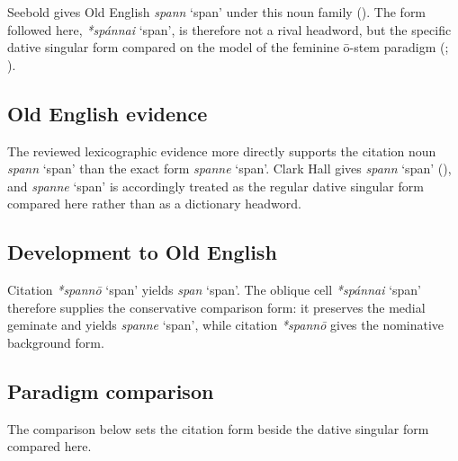 \documentclass[
  british,
  a4paper,
  openany]{book}
\providecommand{\Recon}[1]{\emph{*#1}}
{\catcode`→=\active \global\def→{\ensuremath{\rightarrow}}}
\providecommand{\Recon}[1]{\emph{*#1}}
{\catcode`→=\active \global\def→{\ensuremath{\rightarrow}}}
\begin{document}
Seebold gives Old English {\emph{spann}} `span' under this noun family
(). The form followed here,
{\Recon{spánnai} `span'}, is therefore not a rival headword, but the
specific dative singular form compared on the model of the feminine
ō-stem paradigm (; ).

\subsection{Old English evidence}\label{old-english-evidence-124}

The reviewed lexicographic evidence more directly supports the citation
noun {\emph{spann}} `span' than the exact form {\emph{spanne}} `span'.
Clark Hall gives {\emph{spann}} `span'
(), and
{\emph{spanne}} `span' is accordingly treated as the regular dative
singular form compared here rather than as a dictionary headword.

\subsection{Development to Old
English}\label{development-to-old-english-124}

Citation {\Recon{spannō} `span'} yields {\emph{span}} `span'. The
oblique cell {\Recon{spánnai} `span'} therefore supplies the
conservative comparison form: it preserves the medial geminate and
yields {\emph{spanne}} `span', while citation {\Recon{spannō}} gives the
nominative background form.

\subsection{Paradigm comparison}\label{paradigm-comparison-16}

The comparison below sets the citation form beside the dative singular
form compared here.
\end{document}
